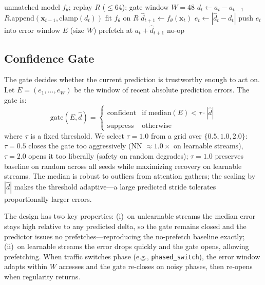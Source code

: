 \documentclass[conference]{IEEEtran}
\begin{document}
\begin{algorithm}
\caption{Gated delta predictor (per memory access $a_t$)}
\label{alg:gated}
\begin{algorithmic}[1]
\REQUIRE unmatched model $f_\theta$; replay $R$ ($\leq 64$); gate window $W = 48$
\STATE $d_t \gets a_t - a_{t-1}$ 
\STATE $R.\text{append}(\mathbf{x}_{t-1}, \text{clamp}(d_t))$
  \STATE fit $f_\theta$ on $R$
\ENDIF
\STATE $\hat{d}_{t+1} \gets f_\theta(\mathbf{x}_t)$
\STATE $e_t \gets |\hat{d}_t - d_t|$
\STATE push $e_t$ into error window $E$ (size $W$)
  \STATE prefetch at $a_t + \hat{d}_{t+1}$
\ELSE
  \STATE no-op
\ENDIF
\end{algorithmic}
\end{algorithm}

\subsection{Confidence Gate}
\label{sec:gate}

The gate decides whether the current prediction is trustworthy enough to act on. Let
$E = (e_1, \ldots, e_W)$ be the window of recent absolute prediction errors. The gate
is:
\begin{equation}
\text{gate}(E, \hat{d}) = \begin{cases}
\text{confident} & \text{if } \text{median}(E) < \tau \cdot |\hat{d}| \\
\text{suppress}  & \text{otherwise}
\end{cases}
\label{eq:gate}
\end{equation}
where $\tau$ is a fixed threshold. We select $\tau = 1.0$ from a grid over
$\{0.5, 1.0, 2.0\}$: $\tau = 0.5$ closes the gate too aggressively (NN $\approx 1.0\times$
on learnable streams), $\tau = 2.0$ opens it too liberally (safety on random degrades);
$\tau = 1.0$ preserves baseline on random across all seeds while maximizing recovery on
learnable streams. The median is robust to outliers from attention gathers; the scaling
by $|\hat{d}|$ makes the threshold adaptive---a large predicted stride tolerates
proportionally larger errors.

The design has two key properties: (i)~on unlearnable streams the median error stays
high relative to any predicted delta, so the gate remains closed and the predictor
issues no prefetches---reproducing the no-prefetch baseline exactly; (ii)~on learnable
streams the error drops quickly and the gate opens, allowing prefetching. When traffic
switches phase (e.g., \texttt{phased\_switch}), the error window adapts within $W$
accesses and the gate re-closes on noisy phases, then re-opens when regularity
returns.
\end{document}
